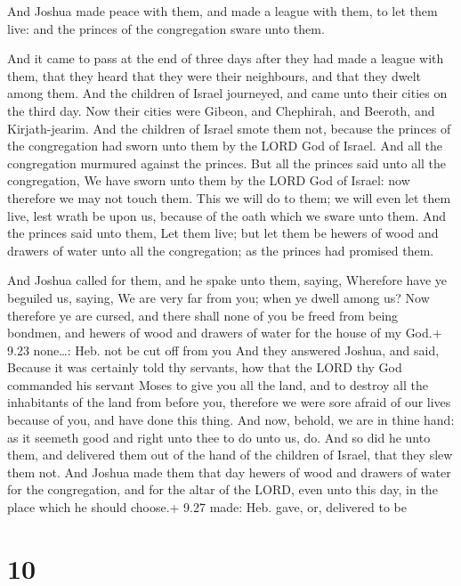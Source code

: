  And Joshua made peace with them, and made a league with
them, to let them live: and the princes of the congregation sware unto
them.

 And it came to pass at the end of three days after they
had made a league with them, that they heard that they were their
neighbours, and that they dwelt among them.  And the
children of Israel journeyed, and came unto their cities on the third
day. Now their cities were Gibeon, and Chephirah, and Beeroth, and
Kirjath-jearim.  And the children of Israel smote them not,
because the princes of the congregation had sworn unto them by the LORD
God of Israel. And all the congregation murmured against the princes.
 But all the princes said unto all the congregation, We
have sworn unto them by the LORD God of Israel: now therefore we may not
touch them.  This we will do to them; we will even let them
live, lest wrath be upon us, because of the oath which we sware unto
them.  And the princes said unto them, Let them live; but
let them be hewers of wood and drawers of water unto all the
congregation; as the princes had promised them.

 And Joshua called for them, and he spake unto them,
saying, Wherefore have ye beguiled us, saying, We are very far from you;
when ye dwell among us?  Now therefore ye are cursed, and
there shall none of you be freed from being bondmen, and hewers of wood
and drawers of water for the house of my God.+ 9.23 none\ldots: Heb. not
be cut off from you  And they answered Joshua, and said,
Because it was certainly told thy servants, how that the LORD thy God
commanded his servant Moses to give you all the land, and to destroy all
the inhabitants of the land from before you, therefore we were sore
afraid of our lives because of you, and have done this thing.
 And now, behold, we are in thine hand: as it seemeth good
and right unto thee to do unto us, do.  And so did he unto
them, and delivered them out of the hand of the children of Israel, that
they slew them not.  And Joshua made them that day hewers
of wood and drawers of water for the congregation, and for the altar of
the LORD, even unto this day, in the place which he should choose.+ 9.27
made: Heb. gave, or, delivered to be

\hypertarget{section-9}{%
\section{10}\label{section-9}}

